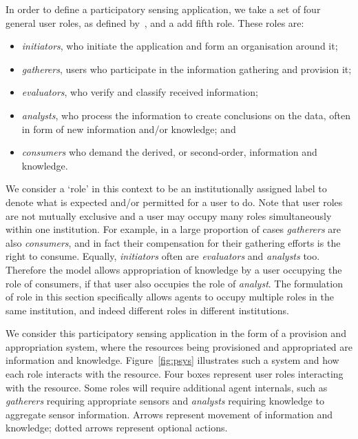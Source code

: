 In order to define a participatory sensing application, we take a set of four general user roles, as defined by~,
and a add fifth role. These roles are: 
\begin{itemize}
\item \emph{initiators}, who initiate the application and form an organisation around it;
\item  \emph{gatherers}, users who participate in the information gathering and provision it; 
\item \emph{evaluators}, who verify and classify received information; 
\item \emph{analysts}, who process the information to create conclusions on the data, often in form of new information and/or knowledge; and
\item \emph{consumers} who demand the derived, or second-order, information and knowledge. 
\end{itemize}
We consider a `role' in this context to be an institutionally assigned label to denote what is expected and/or permitted for a user to do. 
Note that user roles are not mutually exclusive and a user may occupy many roles simultaneously within one institution. For example,
in a large proportion of cases \emph{gatherers} are also \emph{consumers}, and in fact their compensation for their gathering efforts is the right to consume. Equally, \emph{initiators} often are \emph{evaluators} and \emph{analysts} too. Therefore the model allows
appropriation of knowledge by a user occupying the role of consumers, if that user also occupies the role of \emph{analyst}. The
formulation of role in this section specifically allows agents to occupy multiple roles in the same institution, and indeed different
roles in different institutions.

We consider this participatory sensing application in the form of a provision and appropriation system, where the resources being provisioned and appropriated are information and knowledge. Figure~\ref{fig:psys} illustrates such a system and how each role interacts with the resource. Four boxes represent user roles interacting with the resource. Some roles will require additional agent internals, such as \emph{gatherers} requiring appropriate sensors and \emph{analysts} requiring knowledge to aggregate sensor information. Arrows represent movement of information and knowledge; dotted arrows represent optional actions.

